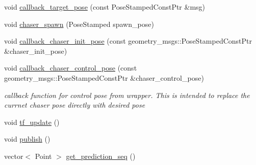 \begin{DoxyCompactItemize}
\item 
void \hyperlink{class_objects_handler_a5ee7bac0ddf6a18e58ca8183e64ff67a}{callback\+\_\+target\+\_\+pose} (const Pose\+Stamped\+Const\+Ptr \&msg)
\item 
void \hyperlink{class_objects_handler_a968feba95e0707919b6c3632781510ba}{chaser\+\_\+spawn} (Pose\+Stamped spawn\+\_\+pose)
\item 
void \hyperlink{class_objects_handler_a4c56416d3583b70d181d69d900b884b5}{callback\+\_\+chaser\+\_\+init\+\_\+pose} (const geometry\+\_\+msgs\+::\+Pose\+Stamped\+Const\+Ptr \&chaser\+\_\+init\+\_\+pose)
\item 
void \hyperlink{class_objects_handler_a28ac9c7ef998a413825cddca78324f61}{callback\+\_\+chaser\+\_\+control\+\_\+pose} (const geometry\+\_\+msgs\+::\+Pose\+Stamped\+Const\+Ptr \&chaser\+\_\+control\+\_\+pose)
\begin{DoxyCompactList}\small\item\em callback function for control pose from wrapper. This is intended to replace the currnet chaser pose directly with desired pose \end{DoxyCompactList}\item 
void \hyperlink{class_objects_handler_a6896e4f9863bd1a4fbc8498d0cb20f09}{tf\+\_\+update} ()
\item 
void \hyperlink{class_objects_handler_a16cf7fca3059a03da4ec795f2af7fb74}{publish} ()
\item 
vector$<$ Point $>$ \hyperlink{class_objects_handler_a4793f1ed257c849b28f0386f635ee714}{get\+\_\+prediction\+\_\+seq} ()
\end{DoxyCompactItemize}
